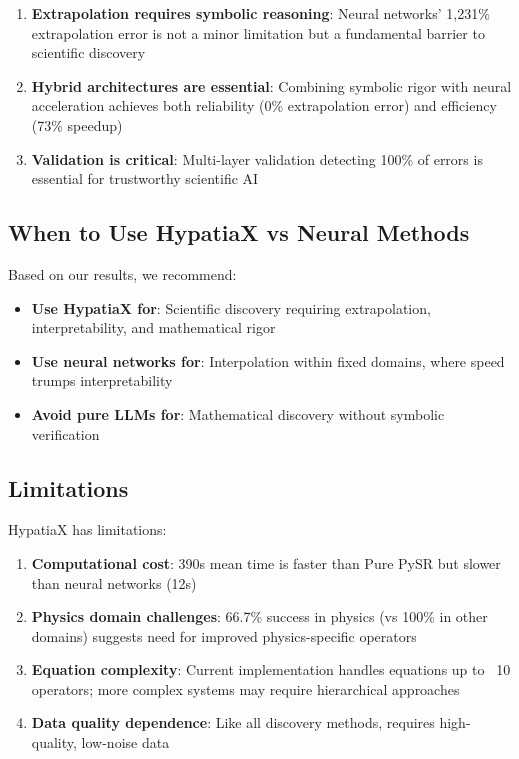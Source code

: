 \documentclass[twoside,11pt]{article}
\begin{document}
\begin{enumerate}
\item \textbf{Extrapolation requires symbolic reasoning}: Neural networks' 1,231\% extrapolation error is not a minor limitation but a fundamental barrier to scientific discovery

\item \textbf{Hybrid architectures are essential}: Combining symbolic rigor with neural acceleration achieves both reliability (0\% extrapolation error) and efficiency (73\% speedup)

\item \textbf{Validation is critical}: Multi-layer validation detecting 100\% of errors is essential for trustworthy scientific AI
\end{enumerate}

\subsection{When to Use HypatiaX vs Neural Methods}

Based on our results, we recommend:

\begin{itemize}
\item \textbf{Use HypatiaX for}: Scientific discovery requiring extrapolation, interpretability, and mathematical rigor
\item \textbf{Use neural networks for}: Interpolation within fixed domains, where speed trumps interpretability
\item \textbf{Avoid pure LLMs for}: Mathematical discovery without symbolic verification
\end{itemize}

\subsection{Limitations}

HypatiaX has limitations:

\begin{enumerate}
\item \textbf{Computational cost}: 390s mean time is faster than Pure PySR but slower than neural networks (12s)

\item \textbf{Physics domain challenges}: 66.7\% success in physics (vs 100\% in other domains) suggests need for improved physics-specific operators

\item \textbf{Equation complexity}: Current implementation handles equations up to ~10 operators; more complex systems may require hierarchical approaches

\item \textbf{Data quality dependence}: Like all discovery methods, requires high-quality, low-noise data
\end{enumerate}
\end{document}
